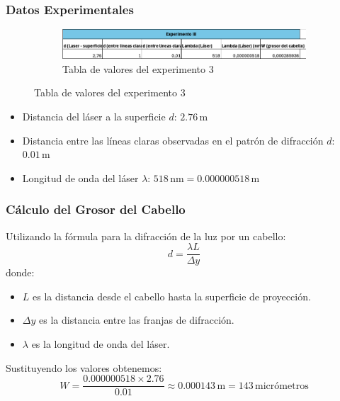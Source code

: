 \subsubsection{Datos Experimentales}

\begin{figure}[H]
  \centering
  \begin{subfigure}[b]{\textwidth}
      \centering
      \includegraphics[width=\textwidth]{Figures/1. Content/tabla-experimento-3.png}
      \caption{Tabla de valores del experimento 3}
      \label{fig: Tabla experimento 3}
  \end{subfigure}
  \hfill
\end{figure}

\begin{itemize}
    \item Distancia del láser a la superficie \(d\): \(2.76 \, \text{m}\)
    \item Distancia entre las líneas claras observadas en el patrón de difracción \(d\): \(0.01 \, \text{m}\)
    \item Longitud de onda del láser \(\lambda\): \(518 \, \text{nm} = 0.000000518 \, \text{m}\)
\end{itemize}

\subsubsection{Cálculo del Grosor del Cabello}
Utilizando la fórmula para la difracción de la luz por un cabello:
\[
d = \frac{\lambda L}{\Delta y}
\]
donde:
\begin{itemize}
    \item \(L\) es la distancia desde el cabello hasta la superficie de proyección.
    \item \(\Delta y\) es la distancia entre las franjas de difracción.
    \item \(\lambda\) es la longitud de onda del láser.
\end{itemize}
Sustituyendo los valores obtenemos:
\[
W = \frac{0.000000518 \times 2.76}{0.01} \approx 0.000143 \, \text{m} = 143 \, \text{micrómetros}
\]

